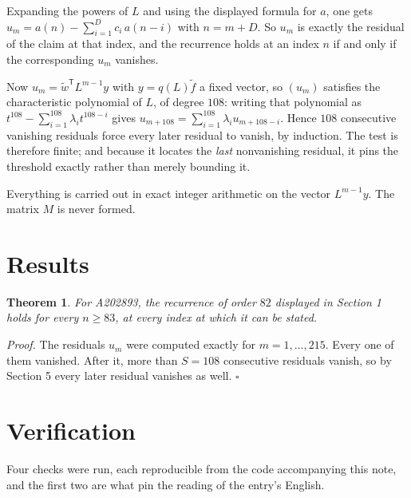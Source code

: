\documentclass[11pt]{article}
\newtheorem{theorem}{Theorem}
\theoremstyle{definition}
\begin{document}
Expanding the powers of $L$ and using the displayed formula for $a$, one gets $u_m = a(n) - \sum_{i=1}^{D} c_i\,a(n-i)$ with $n = m + D$. So $u_m$ is exactly the residual of the claim at that index, and the recurrence holds at an index $n$ if and only if the corresponding $u_m$ vanishes.

Now $u_m = \tilde w^{\mathsf T} L^{m-1} y$ with $y = q(L)\tilde f$ a fixed vector, so $(u_m)$ satisfies the characteristic polynomial of $L$, of degree $108$: writing that polynomial as $t^{108} - \sum_{i=1}^{108} \lambda_i t^{108-i}$ gives $u_{m+108} = \sum_{i=1}^{108} \lambda_i u_{m+108-i}$. Hence $108$ consecutive vanishing residuals force every later residual to vanish, by induction. The test is therefore finite; and because it locates the {\itshape last} nonvanishing residual, it pins the threshold exactly rather than merely bounding it.

Everything is carried out in exact integer arithmetic on the vector $L^{m-1}y$. The matrix $M$ is never formed.

\section{Results}

\begin{theorem} For A202893, the recurrence of order $82$ displayed in Section 1 holds for every $n \ge 83$, at every index at which it can be stated.\end{theorem}

{\itshape Proof.} The residuals $u_m$ were computed exactly for $m = 1,\dots,215$. Every one of them vanished. After it, more than $S = 108$ consecutive residuals vanish, so by Section 5 every later residual vanishes as well. $\square$

\section{Verification}

Four checks were run, each reproducible from the code accompanying this note, and the first two are what pin the reading of the entry's English.
\end{document}
